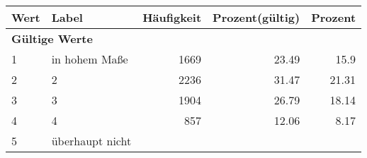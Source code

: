      \begin{longtable}{lXrrr}
     \toprule
     \textbf{Wert} & \textbf{Label} & \textbf{Häufigkeit} & \textbf{Prozent(gültig)} & \textbf{Prozent} \\
     \endhead
     \midrule
     \multicolumn{5}{l}{\textbf{Gültige Werte}}\\

     1 &
     \multicolumn{1}{X}{ in hohem Maße   } &


       \num{1669} &
       \num[round-mode=places,round-precision=2]{23,49} &
         \num[round-mode=places,round-precision=2]{15,9} \\

     2 &
     \multicolumn{1}{X}{ 2   } &


       \num{2236} &
       \num[round-mode=places,round-precision=2]{31,47} &
         \num[round-mode=places,round-precision=2]{21,31} \\

     3 &
     \multicolumn{1}{X}{ 3   } &


       \num{1904} &
       \num[round-mode=places,round-precision=2]{26,79} &
         \num[round-mode=places,round-precision=2]{18,14} \\

     4 &
     \multicolumn{1}{X}{ 4   } &


       \num{857} &
       \num[round-mode=places,round-precision=2]{12,06} &
         \num[round-mode=places,round-precision=2]{8,17} \\

     5 &
     \multicolumn{1}{X}{ überhaupt nicht   } &



\end{longtable}

